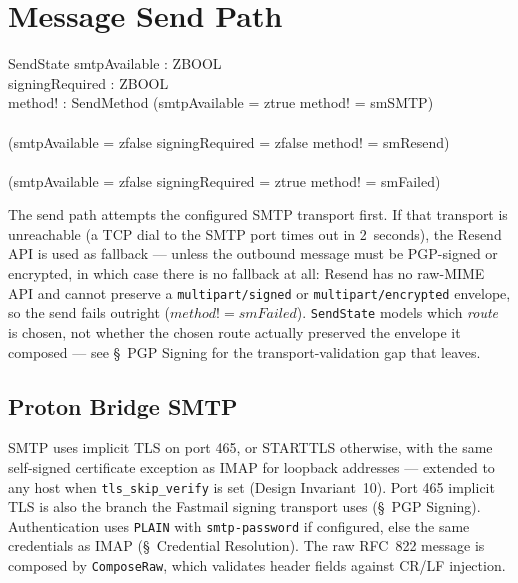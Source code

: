 \documentclass[a4paper,10pt,fleqn]{article}
\begin{document}
\section{Message Send Path}

\begin{schema}{SendState}
  smtpAvailable : ZBOOL \\
  signingRequired : ZBOOL \\
  method! : SendMethod
  \where
  (smtpAvailable = ztrue \implies method! = smSMTP) \\
  \land \\
  (smtpAvailable = zfalse \land signingRequired = zfalse
    \implies method! = smResend) \\
  \land \\
  (smtpAvailable = zfalse \land signingRequired = ztrue
    \implies method! = smFailed)
\end{schema}

The send path attempts the configured SMTP transport first.  If that
transport is unreachable (a TCP dial to the SMTP port times out in
2~seconds), the Resend API is used as fallback --- unless the
outbound message must be PGP-signed or encrypted, in which case
there is no fallback at all: Resend has no raw-MIME API and cannot
preserve a \texttt{multipart/signed} or \texttt{multipart/encrypted}
envelope, so the send fails outright ($method! = smFailed$).
\texttt{SendState} models which \emph{route} is chosen, not whether
the chosen route actually preserved the envelope it composed --- see
\S~PGP Signing for the transport-validation gap that leaves.

\subsection{Proton Bridge SMTP}

SMTP uses implicit TLS on port 465, or STARTTLS otherwise, with the
same self-signed certificate exception as IMAP for loopback addresses
--- extended to any host when \texttt{tls\_skip\_verify} is set
(Design Invariant~10).  Port 465 implicit TLS is also the branch the
Fastmail signing transport uses (\S~PGP Signing).  Authentication uses
\texttt{PLAIN} with \texttt{smtp-password} if configured, else the
same credentials as IMAP (\S~Credential Resolution).  The raw RFC~822
message is composed by \texttt{ComposeRaw}, which validates header
fields against CR/LF injection.
\end{document}
